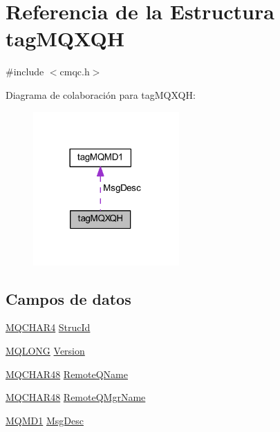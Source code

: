 \hypertarget{structtag_m_q_x_q_h}{}\section{Referencia de la Estructura tag\+M\+Q\+X\+Q\+H}
\label{structtag_m_q_x_q_h}


{\ttfamily \#include $<$cmqc.\+h$>$}



Diagrama de colaboración para tag\+M\+Q\+X\+Q\+H\+:\nopagebreak
\begin{figure}[H]
\begin{center}
\leavevmode
\includegraphics[width=158pt]{structtag_m_q_x_q_h__coll__graph}
\end{center}
\end{figure}
\subsection*{Campos de datos}
\begin{DoxyCompactItemize}
\item 
\hyperlink{cmqc_8h_a12590e546ed66fda7cf21c1d5cefa31d}{M\+Q\+C\+H\+A\+R4} \hyperlink{structtag_m_q_x_q_h_a0530922ca944569b52601d74941f96e4}{Struc\+Id}
\item 
\hyperlink{cmqc_8h_a1fb8d28cbda3fa8766a9821230cdb6d5}{M\+Q\+L\+O\+N\+G} \hyperlink{structtag_m_q_x_q_h_a0656ef8f766b3907d394d88a35d7b7e9}{Version}
\item 
\hyperlink{cmqc_8h_a53b1a2836da03f19144836725ff77919}{M\+Q\+C\+H\+A\+R48} \hyperlink{structtag_m_q_x_q_h_aeadc62f8e5e3d5887d599a5879458a92}{Remote\+Q\+Name}
\item 
\hyperlink{cmqc_8h_a53b1a2836da03f19144836725ff77919}{M\+Q\+C\+H\+A\+R48} \hyperlink{structtag_m_q_x_q_h_a78e0e0316b33b8ed1d4bddb56f5dabe8}{Remote\+Q\+Mgr\+Name}
\item 
\hyperlink{cmqc_8h_a0811cf41b58148bd91248820cff88517}{M\+Q\+M\+D1} \hyperlink{structtag_m_q_x_q_h_a93e5134b6847bf9a3ce68202e2c952e4}{Msg\+Desc}
\end{DoxyCompactItemize}



